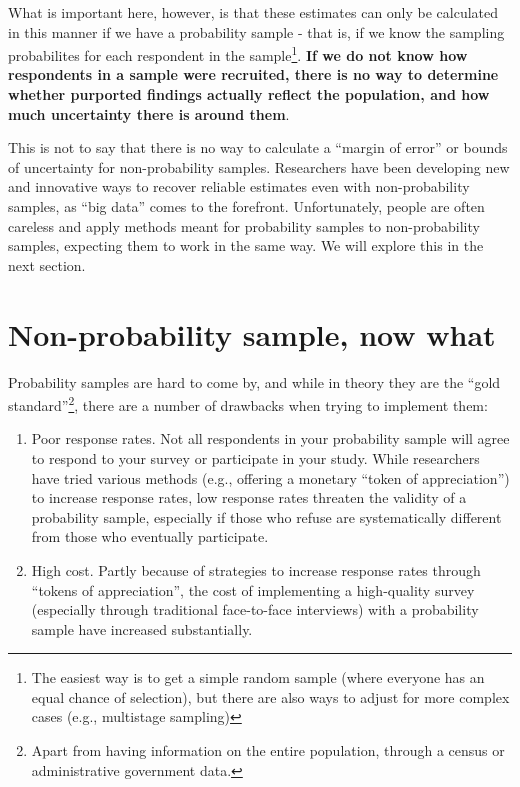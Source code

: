 \documentclass[
  openany]{book}
\providecommand{\tightlist}{%
  \setlength{\itemsep}{0pt}\setlength{\parskip}{0pt}}
\begin{document}
What is important here, however, is that these estimates can only be calculated in this manner if we have a probability sample - that is, if we know the sampling probabilites for each respondent in the sample\footnote{The easiest way is to get a simple random sample (where everyone has an equal chance of selection), but there are also ways to adjust for more complex cases (e.g., multistage sampling)}. \textbf{If we do not know how respondents in a sample were recruited, there is no way to determine whether purported findings actually reflect the population, and how much uncertainty there is around them}.

This is not to say that there is no way to calculate a ``margin of error'' or bounds of uncertainty for non-probability samples. Researchers have been developing new and innovative ways to recover reliable estimates even with non-probability samples, as ``big data'' comes to the forefront. Unfortunately, people are often careless and apply methods meant for probability samples to non-probability samples, expecting them to work in the same way. We will explore this in the next section.

\hypertarget{non-probability-sample-now-what}{%
\section{Non-probability sample, now what}\label{non-probability-sample-now-what}}

Probability samples are hard to come by, and while in theory they are the ``gold standard''\footnote{Apart from having information on the entire population, through a census or administrative government data.}, there are a number of drawbacks when trying to implement them:

\begin{enumerate}
\def\labelenumi{\arabic{enumi}.}
\tightlist
\item
  Poor response rates. Not all respondents in your probability sample will agree to respond to your survey or participate in your study. While researchers have tried various methods (e.g., offering a monetary ``token of appreciation'') to increase response rates, low response rates threaten the validity of a probability sample, especially if those who refuse are systematically different from those who eventually participate.
\item
  High cost. Partly because of strategies to increase response rates through ``tokens of appreciation'', the cost of implementing a high-quality survey (especially through traditional face-to-face interviews) with a probability sample have increased substantially.
\end{enumerate}
\end{document}
